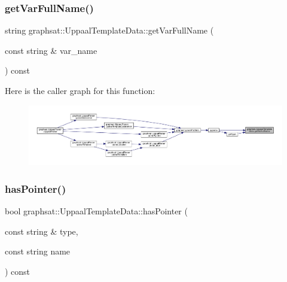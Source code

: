 \subsubsection{\texorpdfstring{getVarFullName()}{getVarFullName()}}
{\footnotesize\ttfamily string graphsat\+::\+Uppaal\+Template\+Data\+::get\+Var\+Full\+Name (\begin{DoxyParamCaption}\item[{const string \&}]{var\+\_\+name }\end{DoxyParamCaption}) const\hspace{0.3cm}{\ttfamily [inline]}}

Here is the caller graph for this function\+:
\nopagebreak
\begin{figure}[H]
\begin{center}
\leavevmode
\includegraphics[width=350pt]{classgraphsat_1_1_uppaal_template_data_a655ac9ea161d412b0a3301d834da15b1_icgraph}
\end{center}
\end{figure}
\mbox{\label{classgraphsat_1_1_uppaal_template_data_a504ceabe99897f4e43877d3c2dbf0c46}} 
\subsubsection{\texorpdfstring{hasPointer()}{hasPointer()}}
{\footnotesize\ttfamily bool graphsat\+::\+Uppaal\+Template\+Data\+::has\+Pointer (\begin{DoxyParamCaption}\item[{const string \&}]{type,  }\item[{const string}]{name }\end{DoxyParamCaption}) const\hspace{0.3cm}{\ttfamily [inline]}}

